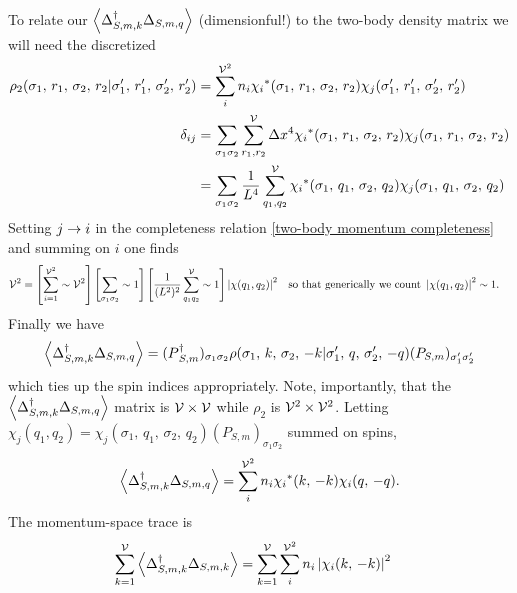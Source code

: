 To relate our $\left\langle \Delta{}^{\dagger}_{S,m,k} \Delta_{S,m,q} \right\rangle$ (dimensionful!) to the two-body density matrix we will need the discretized
\begin{align}
    \rho_2(\sigma_1,\, r_1,\, \sigma_2,\, r_2 | \sigma'_1,\, r'_1,\, \sigma'_2,\, r'_2)
    &= \sum_i^{\mathcal{V}^2} n_i \chi_i{}^*(\sigma_1,\, r_1,\, \sigma_2,\, r_2) \chi_j(\sigma'_1,\, r'_1,\, \sigma'_2,\, r'_2)
    \\
    \delta_{ij}
    &= \sum_{\sigma_1 \sigma_2} \sum_{r_1, r_2}^{\mathcal{V}} \Delta x^4 \chi_i{}^*(\sigma_1,\, r_1,\, \sigma_2,\, r_2) \chi_j(\sigma_1,\, r_1,\, \sigma_2,\, r_2)
    \\
    &= \sum_{\sigma_1 \sigma_2} \frac{1}{L^4} \sum_{q_1, q_2}^{\mathcal{V}} \chi_i{}^*(\sigma_1,\, q_1,\, \sigma_2,\, q_2) \chi_j(\sigma_1,\, q_1,\, \sigma_2,\, q_2)
    \label{eq:two-body momentum completeness}
\end{align}
Setting $j\rightarrow i$ in the completeness relation \eqref{two-body momentum completeness} and summing on $i$ one finds
\begin{align}
    \mathcal{V}^2 &= \left[\sum_{i=1}^{\mathcal{V}^2} \sim \mathcal{V}^2\right] \left[\sum_{\sigma_1 \sigma_2} \sim 1\right] \left[\frac{1}{(L^2)^2} \sum_{q_1 q_2}^{\mathcal{V}} \sim 1\right] \left| \chi(q_1, q_2) \right|^2
    &
    \text{so that generically we count } \left| \chi(q_1, q_2) \right|^2 &\sim 1.
    \label{eq:chi counting}
\end{align}
Finally we have
\begin{align}
    \left\langle \Delta{}^{\dagger}_{S,m,k} \Delta_{S,m,q} \right\rangle
    =
    (P{}^{\dagger}_{S,m})_{\sigma_1 \sigma_2} \rho(\sigma_1,\, k,\, \sigma_2,\, -k | \sigma'_1,\, q,\, \sigma'_2,\, -q) (P_{S,m})_{\sigma'_1\sigma'_2}
\end{align}
which ties up the spin indices appropriately.
Note, importantly, that the $\left\langle \Delta{}^{\dagger}_{S,m,k} \Delta_{S,m,q} \right\rangle$ matrix is $\mathcal{V} \times \mathcal{V}$ while $\rho_2$ is $\mathcal{V}^2 \times \mathcal{V}^2$.
Letting $\chi_j(q_1, q_2) = \chi_j(\sigma_1,\, q_1,\, \sigma_2,\, q_2) (P_{S,m})_{\sigma_1 \sigma_2}$ summed on spins,
\begin{align}
    \left\langle \Delta{}^{\dagger}_{S,m,k} \Delta_{S,m,q} \right\rangle
    =
    \sum_i^{\mathcal{V}^2} n_i \chi_i{}^*(k,\, -k) \chi_i(q,\, -q).
\end{align}
The momentum-space trace is
\begin{align}
    \sum_{k=1}^{\mathcal{V}} \left\langle \Delta{}^{\dagger}_{S,m,k} \Delta_{S,m,k} \right\rangle
    &=
    \sum_{k=1}^{\mathcal{V}} \sum_i^{\mathcal{V}^2} n_i \left| \chi_i(k,\, -k) \right|^2
\end{align}
